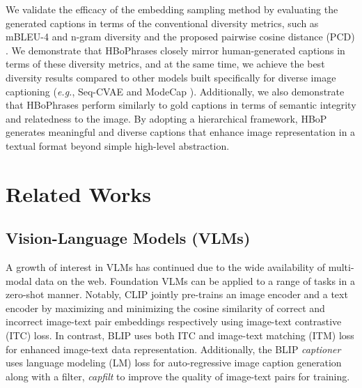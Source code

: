 We validate the efficacy of the embedding sampling method by evaluating the generated captions in terms of the conventional diversity metrics, such as mBLEU-4  and n-gram diversity \cite{aneja2019sequential} and the proposed pairwise cosine distance (PCD) . We demonstrate that HBoPhrases closely mirror human-generated captions in terms of these diversity metrics, and at the same time, we achieve the best diversity results compared to other models built specifically for diverse image captioning (\textit{e.g.}, Seq-CVAE \cite{aneja2019sequential} and ModeCap \cite{chen2022learning}). Additionally, we also demonstrate that HBoPhrases perform similarly to gold captions in terms of semantic integrity and relatedness to the image. By adopting a hierarchical framework, HBoP generates meaningful and diverse captions that enhance image representation in a textual format beyond simple high-level abstraction.


\section{Related Works}
\subsection{Vision-Language Models (VLMs)}
A growth of interest in VLMs has continued due to the wide availability of multi-modal data on the web. Foundation VLMs can be applied to a range of tasks in a zero-shot manner. Notably, CLIP \cite{radford2021learning} jointly pre-trains an image encoder and a text encoder by maximizing and minimizing the cosine similarity of correct and incorrect image-text pair embeddings respectively using image-text contrastive (ITC) loss. In contrast, BLIP \cite{li2022blip} uses both ITC and image-text matching (ITM) loss for enhanced image-text data representation. Additionally, the BLIP \cite{li2022blip} \textit{captioner} uses language modeling (LM) loss for auto-regressive image caption generation along with a filter, \textit{capfilt} to improve the quality of image-text pairs for training.  

